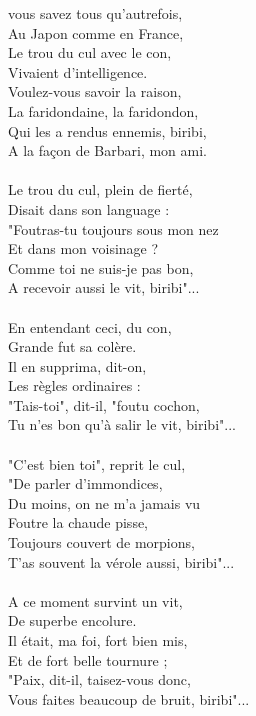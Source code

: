 
 vous savez tous qu’autrefois,
\\Au Japon comme en France,
\\Le trou du cul avec le con,
\\Vivaient d’intelligence.
\\Voulez-vous savoir la raison,
\\La faridondaine, la faridondon,
\\Qui les a rendus ennemis, biribi,
\\A la façon de Barbari, mon ami.
\\\\Le trou du cul, plein de fierté,
\\Disait dans son language :
\\"Foutras-tu toujours sous mon nez
\\Et dans mon voisinage ?
\\Comme toi ne suis-je pas bon,
\\A recevoir aussi le vit, biribi"...
\\\\En entendant ceci, du con,
\\Grande fut sa colère.
\\Il en supprima, dit-on,
\\Les règles ordinaires :
\\"Tais-toi", dit-il, "foutu cochon,
\\Tu n’es bon qu’à salir le vit, biribi"...
\\\\"C’est bien toi", reprit le cul,
\\"De parler d’immondices,
\\Du moins, on ne m’a jamais vu
\\Foutre la chaude pisse,
\\Toujours couvert de morpions,
\\T’as souvent la vérole aussi, biribi"...
\\\\A ce moment survint un vit,
\\De superbe encolure.
\\Il était, ma foi, fort bien mis,
\\Et de fort belle tournure ;
\\"Paix, dit-il, taisez-vous donc,
\\Vous faites beaucoup de bruit, biribi"...
